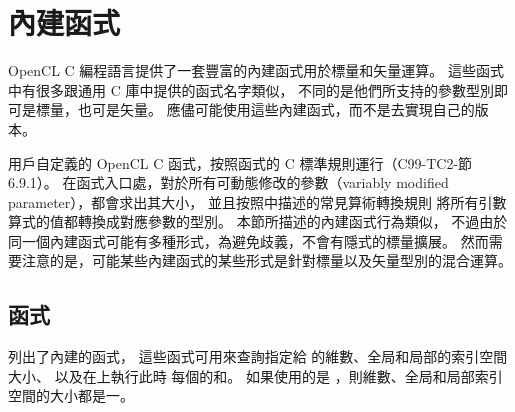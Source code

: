 \section{內建函式}

OpenCL C 編程語言提供了一套豐富的內建函式用於標量和矢量運算。
這些函式中有很多跟通用 C 庫中提供的函式名字類似，
不同的是他們所支持的參數型別即可是標量，也可是矢量。
應儘可能使用這些內建函式，而不是去實現自己的版本。

用戶自定義的 OpenCL C 函式，按照函式的 C 標準規則運行（C99-TC2-節 6.9.1）。
在函式入口處，對於所有可動態修改的參數（variably modified parameter），都會求出其大小，
並且按照中描述的常見算術轉換規則
將所有引數算式的值都轉換成對應參數的型別。
本節所描述的內建函式行為類似，
不過由於同一個內建函式可能有多種形式，為避免歧義，不會有隱式的標量擴展。
然而需要注意的是，可能某些內建函式的某些形式是針對標量以及矢量型別的混合運算。

\subsection{函式}

列出了內建的函式，
這些函式可用來查詢指定給  的維數、全局和局部的索引空間大小、
以及在上執行此時
每個的和。
如果使用的是 ，則維數、全局和局部索引空間的大小都是一。

{}
